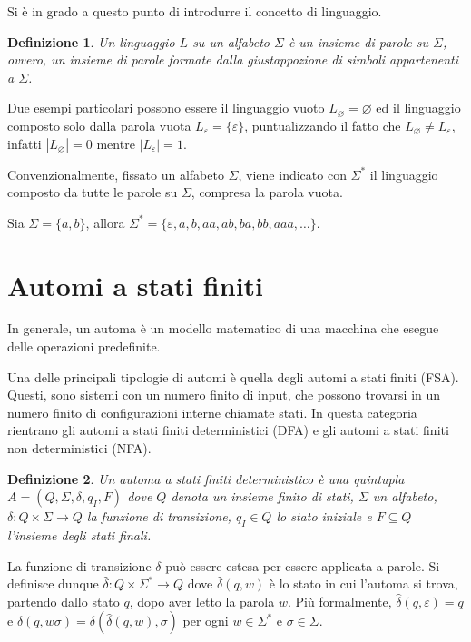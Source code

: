 \documentclass[a4paper,12pt]{report} %
\newtheorem{definition}{Definizione}[chapter] %
\begin{document}
Si è in grado a questo punto di introdurre il concetto di linguaggio.

\begin{definition}\label{def:lang}
  Un \emph{linguaggio} $L$ su un alfabeto $\Sigma$ è un insieme di parole su $\Sigma$, ovvero, un insieme di
  parole formate dalla giustappozione di simboli appartenenti a $\Sigma$.
\end{definition}

Due esempi particolari possono essere il linguaggio vuoto $L_\varnothing = \varnothing$ ed il linguaggio composto
solo dalla parola vuota $L_\varepsilon = \{\varepsilon\}$, puntualizzando il fatto che $L_\varnothing \neq L_\varepsilon$,
infatti $|L_\varnothing| = 0$ mentre $|L_\varepsilon| = 1$.

Convenzionalmente, fissato un alfabeto $\Sigma$, viene indicato con $\Sigma^*$ il linguaggio composto da tutte
le parole su $\Sigma$, compresa la parola vuota.

Sia $\Sigma = \{a, b\}$, allora $\Sigma^* = \{\varepsilon, a, b, aa, ab, ba, bb, aaa, \dots\}$.

\section{Automi a stati finiti}

In generale, un automa è un modello matematico di una macchina che esegue delle operazioni predefinite.

Una delle principali tipologie di automi è quella degli automi a stati finiti (FSA). Questi, sono sistemi
con un numero finito di input, che possono trovarsi in un numero finito di configurazioni interne chiamate stati. 
In questa categoria rientrano gli automi a stati finiti deterministici (DFA) e gli automi a stati finiti 
non deterministici (NFA).

\begin{definition}
  \label{def:dfa}
  Un \emph{automa a stati finiti deterministico} è una quintupla $A = (Q, \Sigma, \delta, \allowbreak q_I, F)$
  dove $Q$ denota un insieme finito di stati, $\Sigma$ un alfabeto, $\delta: Q \times \Sigma \rightarrow Q$ 
  la funzione di transizione, $q_I \in Q$ lo stato iniziale e $F \subseteq Q$ l'insieme degli stati finali.
\end{definition}

La funzione di transizione $\delta$ può essere estesa per essere applicata a parole. Si definisce dunque
$\hat{\delta}: Q \times \Sigma^* \rightarrow Q$ dove $\hat{\delta}(q, w)$ è lo stato in cui l'automa si trova,
partendo dallo stato $q$, dopo aver letto la parola $w$. Più formalmente, $\hat{\delta}(q, \varepsilon) = q$ e
$\hat{\delta}(q, w\sigma) = \delta(\hat{\delta}(q, w), \sigma)$ per ogni $w \in \Sigma^*$ e $\sigma \in \Sigma$.
\end{document}
